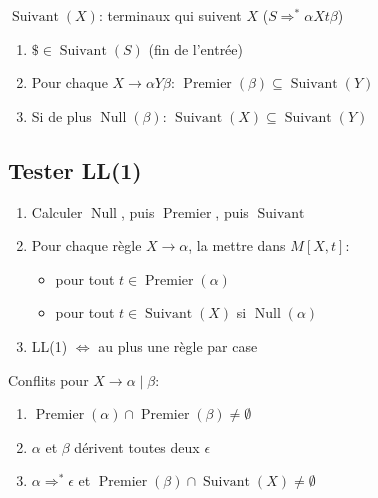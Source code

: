\documentclass[12pt, a4paper]{article}
\newcommand{\Null}{\operatorname{Null}}
\newcommand{\Prem}{\operatorname{Premier}}
\newcommand{\Suiv}{\operatorname{Suivant}}
\begin{document}
\begin{multicols*}{3}
	$\Suiv(X)$: terminaux qui suivent $X$ ($S\Rightarrow^*\alpha Xt\beta$)
	\begin{enumerate}[\roman*.]
		\item $\$\in\Suiv(S)$ (fin de l'entrée)
		\item Pour chaque $X\rightarrow\alpha Y\beta$: $\Prem(\beta)\subseteq\Suiv(Y)$
		\item Si de plus $\Null(\beta)$: $\Suiv(X)\subseteq\Suiv(Y)$
	\end{enumerate}
 
	\subsection{Tester LL(1)}
	\begin{enumerate}[\roman*.]
		\item Calculer $\Null$, puis $\Prem$, puis $\Suiv$
		\item Pour chaque règle $X\rightarrow\alpha$, la mettre dans $M[X,t]$:
		\begin{itemize}
			\item pour tout $t\in\Prem(\alpha)$
			\item pour tout $t\in\Suiv(X)$ si $\Null(\alpha)$
		\end{itemize}
		\item LL(1) $\iff$ au plus une règle par case
	\end{enumerate}
	Conflits pour $X\rightarrow\alpha\mid\beta$:
	\begin{enumerate}[\roman*.]
		\item $\Prem(\alpha)\cap\Prem(\beta)\neq\emptyset$
		\item $\alpha$ et $\beta$ dérivent toutes deux $\epsilon$
		\item $\alpha\Rightarrow^*\epsilon$ et $\Prem(\beta)\cap\Suiv(X)\neq\emptyset$
	\end{enumerate}
 
  \colbreak

\end{multicols*}
\end{document}
